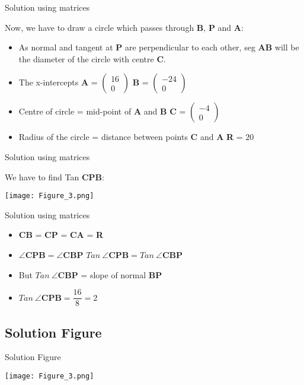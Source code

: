 \documentclass{beamer}
\begin{document}
\begin{frame}{Solution using matrices}{}
  {
   Now, we have to draw a circle which passes through \textbf{B}, \textbf{P} and \textbf{A}:
   \begin{itemize}
   \item
        As normal and tangent at \textbf{P} are perpendicular to each other, seg \textbf{AB} will be the diameter of the circle with centre \textbf{C}.   \pause
   \item 
        The x-intercepts \quad \textbf{A} = \(\begin{pmatrix} 16 \\ 0\end{pmatrix}\) \qquad \textbf{B} = \(\begin{pmatrix} -24 \\ 0\end{pmatrix}\)  \pause
   \item
         Centre of circle = mid-point of \textbf{A} and \textbf{B} \linebreak \implies \textbf{C} = \(\begin{pmatrix} -4 \\ 0\end{pmatrix}\) \pause
   \item 
        Radius of the circle = distance between points \textbf{C} and \textbf{A} \linebreak \implies \textbf{R} = \(20\)
   \end{itemize}
  }
\end{frame}

\begin{frame}{Solution using matrices}{}
  {
   We have to find Tan \angle \textbf{CPB}:
   \begin{center}
       \texttt{[image: Figure\_3.png]}
   \end{center}
  }
\end{frame}

\begin{frame}{Solution using matrices}{}
  {
   \begin{itemize}
   \item 
        \textbf{CB} = \textbf{CP} = \textbf{CA} = \textbf{R} \pause
   \item 
        \(\angle \textbf{CPB} = \angle \textbf{CBP} \) \implies \(Tan\ \angle \textbf{CPB} = Tan\ \angle \textbf{CBP} \) \pause
   \item
        But \(Tan\ \angle \textbf{CBP}\) = slope of normal \textbf{BP}  \pause
   \item
        \therfore \( Tan\ \angle \textbf{CPB} = \dfrac{16}{8} = 2 \)   
   \end{itemize}
  }
\end{frame}

\subsection{Solution Figure}

\begin{frame}{Solution Figure}{}
  {
   \begin{center}
       \texttt{[image: Figure\_3.png]}
   \end{center}
  }
\end{frame}
\end{document}
